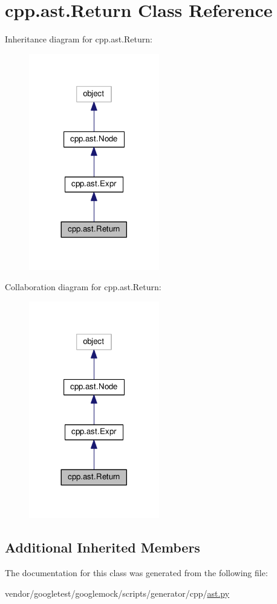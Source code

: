 \hypertarget{classcpp_1_1ast_1_1Return}{}\section{cpp.\+ast.\+Return Class Reference}
\label{classcpp_1_1ast_1_1Return}


Inheritance diagram for cpp.\+ast.\+Return\+:\nopagebreak
\begin{figure}[H]
\begin{center}
\leavevmode
\includegraphics[width=161pt]{classcpp_1_1ast_1_1Return__inherit__graph}
\end{center}
\end{figure}


Collaboration diagram for cpp.\+ast.\+Return\+:\nopagebreak
\begin{figure}[H]
\begin{center}
\leavevmode
\includegraphics[width=161pt]{classcpp_1_1ast_1_1Return__coll__graph}
\end{center}
\end{figure}
\subsection*{Additional Inherited Members}


The documentation for this class was generated from the following file\+:\begin{DoxyCompactItemize}
\item 
vendor/googletest/googlemock/scripts/generator/cpp/\hyperlink{ast_8py}{ast.\+py}\end{DoxyCompactItemize}

